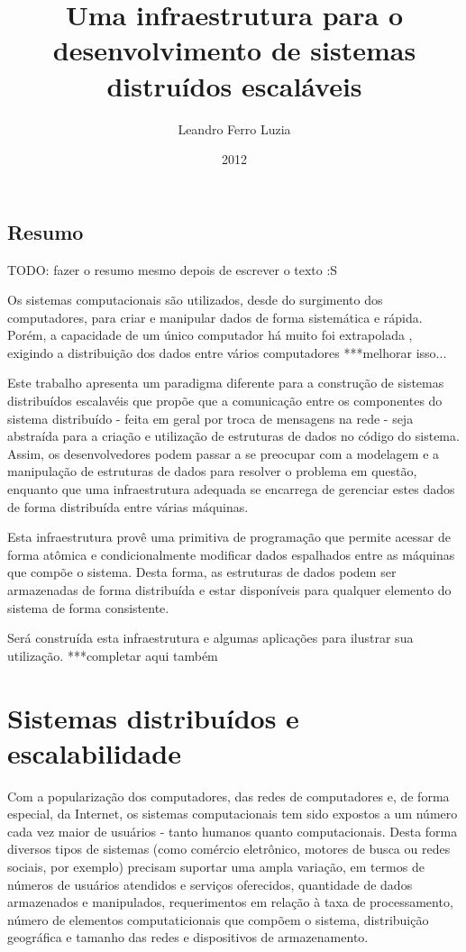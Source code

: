 \documentclass[a4paper,12pt]{report}
\title{Uma infraestrutura para o desenvolvimento de sistemas distruídos escaláveis}
\author{Leandro Ferro Luzia}
\date{2012}
\begin{document}
\pagestyle{headings}
\maketitle
\section*{Resumo}
TODO: fazer o resumo mesmo depois de escrever o texto :S

Os sistemas computacionais são utilizados, desde do surgimento dos computadores, para criar e manipular dados de forma sistemática e rápida. Porém, a capacidade de um único computador há muito foi extrapolada , exigindo a distribuição dos dados entre vários computadores ***melhorar isso...

Este trabalho apresenta um paradigma diferente para a construção de sistemas distribuídos escalavéis que propõe que a comunicação entre os componentes do sistema distribuído - feita em geral por troca de mensagens na rede - seja abstraída para a criação e utilização de estruturas de dados no código do sistema. Assim, os desenvolvedores podem passar a se preocupar com a modelagem e a manipulação de estruturas de dados para resolver o problema em questão, enquanto que uma infraestrutura adequada se encarrega de gerenciar estes dados de forma distribuída entre várias máquinas.

Esta infraestrutura provê uma primitiva de programação que permite acessar de forma atômica e condicionalmente modificar dados espalhados entre as máquinas que compõe o sistema. Desta forma, as estruturas de dados podem ser armazenadas de forma distribuída e estar disponíveis para qualquer elemento do sistema de forma consistente.

Será construída esta infraestrutura e algumas aplicações para ilustrar sua utilização. ***completar aqui também
\tableofcontents
\listoftables
\listoffigures
\chapter{Sistemas distribuídos e escalabilidade}
Com a popularização dos computadores, das redes de computadores e, de forma especial, da Internet, os sistemas computacionais tem sido expostos a um número cada vez maior de usuários - tanto humanos quanto computacionais. Desta forma diversos tipos de sistemas (como comércio eletrônico, motores de busca ou redes sociais, por exemplo) precisam suportar uma ampla variação, em termos de números de usuários atendidos e serviços oferecidos, quantidade de dados armazenados e manipulados, requerimentos em relação à taxa de processamento, número de elementos computaticionais que compõem o sistema, distribuição geográfica e tamanho das redes e dispositivos de armazenamento. 
\end{document}
